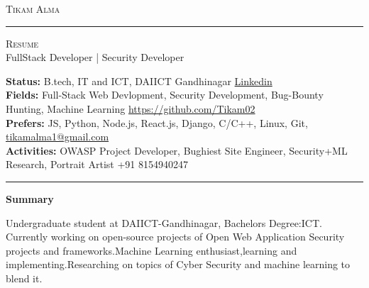 \documentclass[10pt,A4]{article}
\newcommand{\cvsection}[1]
{
	\begin{center}
		\large\textcolor{sectcol}{\textbf{#1}}
	\end{center}
}
\newcommand{\metasection}[2]
{
\footnotesize{#2} \hspace*{\fill} \footnotesize{#1}\\[1pt]
}
\begin{document}
\pagestyle{fancy}	








\vspace{-8pt}
\begin{center}
	\HUGE \textsc{Tikam Alma} \textcolor{sectcol}{\rule[-1mm]{1mm}{0.9cm}} \textsc{Resume}\\[2pt]
	\small FullStack Developer | Security Developer 
\end{center}



\vspace{6pt}


\metasection{\href{https://www.linkedin.com/in/tikam-alma-993225b8/}{Linkedin}}{\textbf{Status:} B.tech, IT and ICT, DAIICT Gandhinagar}
\metasection{\href{https://github.com/Tikam02}{https://github.com/Tikam02}}{\textbf{Fields:} Full-Stack Web Devlopment, Security Development, Bug-Bounty Hunting, Machine Learning} 
\metasection{\href{tikamalma1@gmail.com}{tikamalma1@gmail.com}}{\textbf{Prefers:} JS, Python, Node.js, React.js, Django, C/C++, Linux, Git,}
\metasection{+91 8154940247}{\textbf{Activities:} OWASP Project Developer, Bughiest Site Engineer, Security+ML Research, Portrait Artist}
\vspace{-2pt}
\textcolor{softcol}{\hrule}
\vspace{6pt}

\normalsize

\vspace{-6pt}
\cvsection{Summary}
Undergraduate student at DAIICT-Gandhinagar, Bachelors Degree:ICT.
Currently working on open-source projects of Open Web Application Security projects and frameworks.Machine Learning enthusiast,learning and implementing.Researching on topics of Cyber Security and machine learning to blend it.\\
\end{document}
